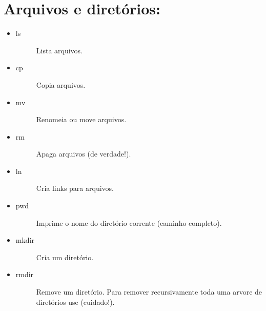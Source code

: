 \documentclass[a4paper,10pt,brazil]{sphinxmanual}
\begin{document}
\section{Arquivos e diretórios:}
\label{unix:arquivos-e-diretorios}\begin{itemize}
\item {} \begin{description}
\item[{ls}] \leavevmode
Lista arquivos.

\end{description}

\item {} \begin{description}
\item[{cp}] \leavevmode
Copia arquivos.

\end{description}

\item {} \begin{description}
\item[{mv}] \leavevmode
Renomeia ou move arquivos.

\end{description}

\item {} \begin{description}
\item[{rm}] \leavevmode
Apaga arquivos (de verdade!).

\end{description}

\item {} \begin{description}
\item[{ln}] \leavevmode
Cria links para arquivos.

\end{description}

\item {} \begin{description}
\item[{pwd}] \leavevmode
Imprime o nome do diretório corrente (caminho completo).

\end{description}

\item {} \begin{description}
\item[{mkdir}] \leavevmode
Cria um diretório.

\end{description}

\item {} \begin{description}
\item[{rmdir}] \leavevmode
Remove um diretório. Para remover recursivamente toda uma arvore de diretórios use  (cuidado!).

\end{description}

\end{itemize}
\end{document}
